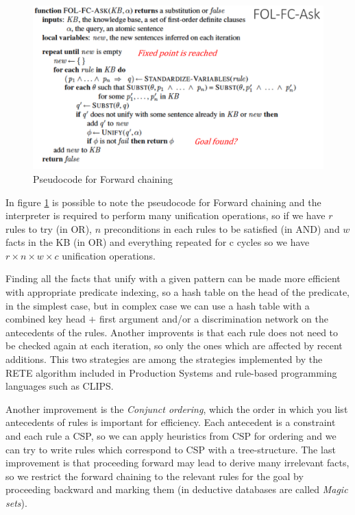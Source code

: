 \begin{figure}
	\includegraphics[width=\textwidth]{Images/forwardChaining}
	\caption{Pseudocode for Forward chaining}
	\label{img:forwardChaining}
\end{figure}
In figure \ref{img:forwardChaining} is possible to note the pseudocode for Forward chaining
and the interpreter is required to perform many unification operations, so if we have
$r$ rules to try (in OR), $n$ preconditions in each rules to be satisfied (in AND) and 
$w$ facts in the KB (in OR) and everything repeated for c cycles so we have 
$r \times n \times w \times c$ unification operations.

Finding all the facts that unify with a given pattern can be made more efficient 
with appropriate predicate indexing, so a hash table on the head of the predicate,
in the simplest case, but in complex case we can use a hash table with a combined key head
$+$ first argument and/or a discrimination network on the antecedents of the rules.\newline
Another improvents is that each rule does not need to be checked again at each iteration, so
only the ones which are affected by recent additions.
This two strategies are among the strategies implemented by the RETE algorithm included
in Production Systems and rule-based programming languages such as CLIPS.

Another improvement is the \emph{Conjunct ordering}, which the order in which you list
antecedents of rules is important for efficiency.\newline
Each antecedent is a constraint and each rule a CSP, so we can apply heuristics from CSP for
ordering and we can try to write rules which correspond to CSP with a tree-structure.\newline
The last improvement is that proceeding forward may lead to derive many irrelevant facts,
so we restrict the forward chaining to the relevant rules for the goal by proceeding backward
and marking them (in deductive databases are called \emph{Magic sets}).

